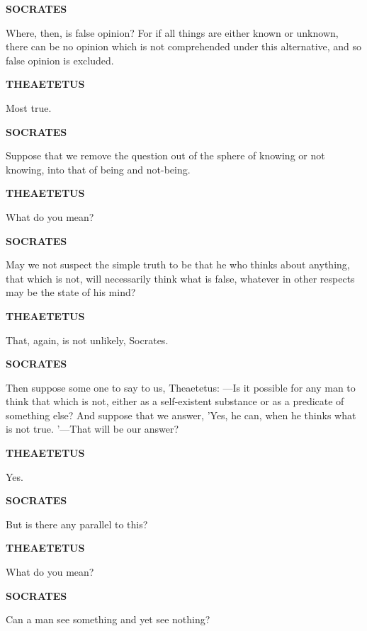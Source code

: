 \documentclass[11pt,letter]{article}
\begin{document}
\par \textbf{SOCRATES}
\par   Where, then, is false opinion? For if all things are either known or unknown, there can be no opinion which is not comprehended under this alternative, and so false opinion is excluded.

\par \textbf{THEAETETUS}
\par   Most true.

\par \textbf{SOCRATES}
\par   Suppose that we remove the question out of the sphere of knowing or not knowing, into that of being and not-being.

\par \textbf{THEAETETUS}
\par   What do you mean?

\par \textbf{SOCRATES}
\par   May we not suspect the simple truth to be that he who thinks about anything, that which is not, will necessarily think what is false, whatever in other respects may be the state of his mind?

\par \textbf{THEAETETUS}
\par   That, again, is not unlikely, Socrates.

\par \textbf{SOCRATES}
\par   Then suppose some one to say to us, Theaetetus: —Is it possible for any man to think that which is not, either as a self-existent substance or as a predicate of something else? And suppose that we answer, 'Yes, he can, when he thinks what is not true. '—That will be our answer?

\par \textbf{THEAETETUS}
\par   Yes.

\par \textbf{SOCRATES}
\par   But is there any parallel to this?

\par \textbf{THEAETETUS}
\par   What do you mean?

\par \textbf{SOCRATES}
\par   Can a man see something and yet see nothing?
\end{document}
